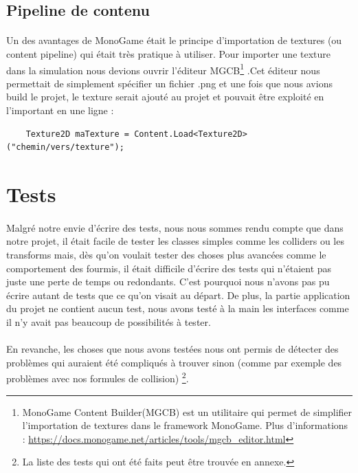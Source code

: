 \documentclass{EPUProjetDi}
\begin{document}
\subsection{Pipeline de contenu}
\paragraph{}
Un des avantages de MonoGame était le principe d'importation de textures (ou content pipeline) qui était très pratique à utiliser. Pour importer une texture dans la simulation nous devions ouvrir l'éditeur 
MGCB\footnote{MonoGame Content Builder(MGCB) est un utilitaire qui permet de simplifier l'importation de textures dans le framework MonoGame. Plus d'informations : \url{https://docs.monogame.net/articles/tools/mgcb_editor.html}}
.Cet éditeur nous permettait de simplement spécifier un fichier .png et une fois que nous avions build le projet, le texture serait ajouté au projet et pouvait être exploité en l'important en une ligne : 
\begin{verbatim}
    Texture2D maTexture = Content.Load<Texture2D>("chemin/vers/texture");
\end{verbatim}

\section{Tests}

\paragraph{}
Malgré notre envie d'écrire des tests, nous nous sommes rendu compte que dans notre projet, il était facile de tester les classes simples comme les colliders ou les transforms
mais, dès qu'on voulait tester des choses plus avancées comme le comportement des fourmis, il était difficile d'écrire des tests qui n'étaient pas juste une perte de temps ou redondants.
C'est pourquoi nous n'avons pas pu écrire autant de tests que ce qu'on visait au départ. De plus, la partie application du projet ne contient aucun test, nous avons testé à la main les interfaces comme il n'y
avait pas beaucoup de possibilités à tester.

\paragraph{}
En revanche, les choses que nous avons testées nous ont permis de détecter des problèmes qui auraient été compliqués à trouver sinon (comme par exemple des problèmes avec nos formules de collision)
\footnote{La liste des tests qui ont été faits peut être trouvée en annexe.}.
\end{document}
